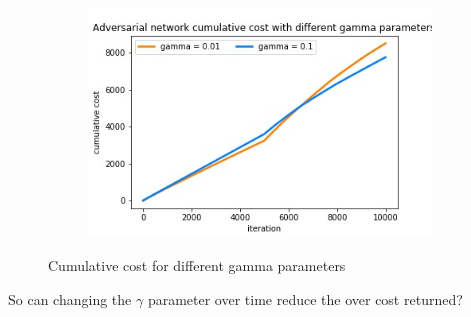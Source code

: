 \begin{figure}[h!]
\centering
\begin{subfigure}{1.0\textwidth}
  \centering
  \includegraphics[width=10cm]{../plots/changing_gamma_cumul_cost.jpg}
  \caption{}
  \label{}
\end{subfigure}
\caption{Cumulative cost for different gamma parameters}
\label{fig:ullm-particle}
\end{figure}


So can changing the $\gamma$ parameter over time reduce the over cost returned? 


\pagebreak


\appendix %



%
%





